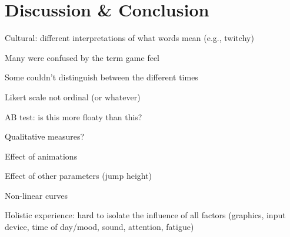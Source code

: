 \section{Discussion \& Conclusion} \label{discussion}
Cultural: different interpretations of what words mean (e.g., twitchy)

Many were confused by the term game feel

Some couldn't distinguish between the different times

Likert scale not ordinal (or whatever)

AB test: is this more floaty than this?

Qualitative measures?

Effect of animations

Effect of other parameters (jump height)

Non-linear curves

Holistic experience: hard to isolate the influence of all factors (graphics, input device, time of day/mood, sound, attention, fatigue)
